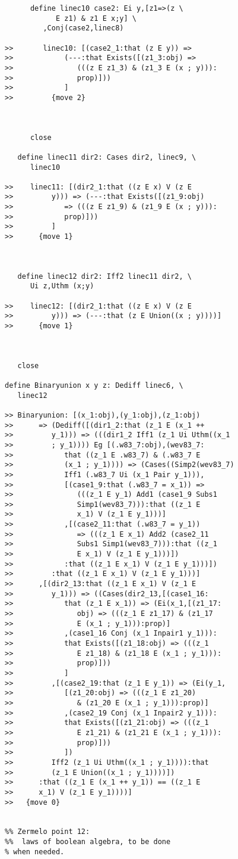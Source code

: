 \documentclass[12pt]{article}
\begin{document}
\begin{verbatim}
      define linec10 case2: Ei y,[z1=>(z \
            E z1) & z1 E x;y] \
         ,Conj(case2,linec8)

>>       linec10: [(case2_1:that (z E y)) =>
>>            (---:that Exists([(z1_3:obj) =>
>>               (((z E z1_3) & (z1_3 E (x ; y))):
>>               prop)]))
>>            ]
>>         {move 2}



      close

   define linec11 dir2: Cases dir2, linec9, \
      linec10

>>    linec11: [(dir2_1:that ((z E x) V (z E
>>         y))) => (---:that Exists([(z1_9:obj)
>>            => (((z E z1_9) & (z1_9 E (x ; y))):
>>            prop)]))
>>         ]
>>      {move 1}



   define linec12 dir2: Iff2 linec11 dir2, \
      Ui z,Uthm (x;y)

>>    linec12: [(dir2_1:that ((z E x) V (z E
>>         y))) => (---:that (z E Union((x ; y))))]
>>      {move 1}



   close

define Binaryunion x y z: Dediff linec6, \
   linec12

>> Binaryunion: [(x_1:obj),(y_1:obj),(z_1:obj)
>>      => (Dediff([(dir1_2:that (z_1 E (x_1 ++
>>         y_1))) => (((dir1_2 Iff1 (z_1 Ui Uthm((x_1
>>         ; y_1)))) Eg [(.w83_7:obj),(wev83_7:
>>            that ((z_1 E .w83_7) & (.w83_7 E
>>            (x_1 ; y_1)))) => (Cases((Simp2(wev83_7)
>>            Iff1 (.w83_7 Ui (x_1 Pair y_1))),
>>            [(case1_9:that (.w83_7 = x_1)) =>
>>               (((z_1 E y_1) Add1 (case1_9 Subs1
>>               Simp1(wev83_7))):that ((z_1 E
>>               x_1) V (z_1 E y_1)))]
>>            ,[(case2_11:that (.w83_7 = y_1))
>>               => (((z_1 E x_1) Add2 (case2_11
>>               Subs1 Simp1(wev83_7))):that ((z_1
>>               E x_1) V (z_1 E y_1)))])
>>            :that ((z_1 E x_1) V (z_1 E y_1)))])
>>         :that ((z_1 E x_1) V (z_1 E y_1)))]
>>      ,[(dir2_13:that ((z_1 E x_1) V (z_1 E
>>         y_1))) => ((Cases(dir2_13,[(case1_16:
>>            that (z_1 E x_1)) => (Ei(x_1,[(z1_17:
>>               obj) => (((z_1 E z1_17) & (z1_17
>>               E (x_1 ; y_1))):prop)]
>>            ,(case1_16 Conj (x_1 Inpair1 y_1))):
>>            that Exists([(z1_18:obj) => (((z_1
>>               E z1_18) & (z1_18 E (x_1 ; y_1))):
>>               prop)]))
>>            ]
>>         ,[(case2_19:that (z_1 E y_1)) => (Ei(y_1,
>>            [(z1_20:obj) => (((z_1 E z1_20)
>>               & (z1_20 E (x_1 ; y_1))):prop)]
>>            ,(case2_19 Conj (x_1 Inpair2 y_1))):
>>            that Exists([(z1_21:obj) => (((z_1
>>               E z1_21) & (z1_21 E (x_1 ; y_1))):
>>               prop)]))
>>            ])
>>         Iff2 (z_1 Ui Uthm((x_1 ; y_1)))):that
>>         (z_1 E Union((x_1 ; y_1))))])
>>      :that ((z_1 E (x_1 ++ y_1)) == ((z_1 E
>>      x_1) V (z_1 E y_1))))]
>>   {move 0}


%% Zermelo point 12:  
%%  laws of boolean algebra, to be done
% when needed.

\end{verbatim}
\end{document}
